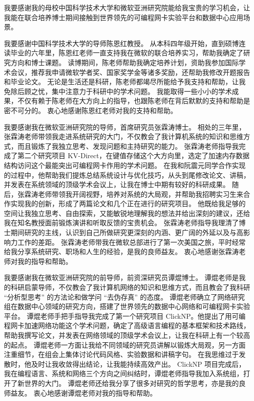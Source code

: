 
\begin{acknowledgements}

我要感谢我的母校中国科学技术⼤学和微软亚洲研究院能给我宝贵的学习机会，让我能在联合培养博士期间接触到世界领先的可编程网卡实验平台和数据中心应用场景。

我要感谢中国科学技术⼤学的导师陈恩红教授。
从本科四年级开始，直到硕博连读毕业的六年里，陈恩红老师一直支持我在微软的联合培养实习，帮助我确定了研究方向和博士课题。
读博期间，陈老师帮助我确定培养计划，资助我参加国际学术会议，推荐我申请微软学者奖、国家奖学金等诸多奖励，还帮助我修改开题报告和毕业论文。
无论是生活还是科研，陈老师都竭尽所能给予我⽀持和帮助，让我免除后顾之忧，集中注意⼒于科研中的学术问题。
我能取得一些小小的学术成果，不仅有赖于陈⽼师在大方向上的指导，也跟陈老师在背后默默的⽀持和帮助是密不可分的。
衷心地感谢陈恩红老师对我的支持和帮助。

我要感谢我在微软亚洲研究院的导师，首席研究员张霖涛博士。
相处的三年里，张霖涛老师带领我走进系统研究的大门，不仅教会了我计算机系统的知识和思维方式，而且锻炼了我独立思考、发现问题和主持研究的能力。
张霖涛老师指导我完成了第二个研究项目 KV-Direct，在键值存储这个大方向里，选定了加速内存数据结构访问这个最能突出可编程网卡作用的学术问题。
在我和阮震元同学合作实现的过程中，他帮助我们提炼总结系统设计与优化技巧，从头到尾修改论文、讲稿，并发表在系统领域的顶级学术会议上，让我在博士中期有较好的科研成果。
随后，张霖涛老师带领我开阔视野，培养对系统的大局观，并帮助我招聘实习生来合作实现我的创新，形成了两篇论文和几个正在进行的研究项目。
他既给我足够的空间让我独立思考、自由探索，又能敏锐地理解我的想法并给出深刻的建议，还给我在知名教授面前锻炼演讲和听取反馈的宝贵机会。
张霖涛老师指导我理清了博士期间研究的主线，认识到自己所做研究更深刻的内涵、更广阔的外延以及与高影响力工作的差距。
张霖涛老师带我在微软总部进行了第一次美国之旅，平时经常给我分享系统研究、职场和人生的经验，是我的良师益友。
衷心地感谢张霖涛老师对我的指导和帮助。

我要感谢我在微软亚洲研究院的前导师，前资深研究员谭焜博⼠。
谭焜老师是我的科研启蒙导师，不仅教会了我计算机⽹络的知识和思维⽅式，⽽且教会了我科研 ``分析型思考'' 的⽅法论和做学问 ``去伪存真'' 的态度。
谭焜老师确立了网络研究组在数据中心领域的研究方向，搭建了世界领先的数据中心网络和可编程网卡实验平台。
谭焜老师手把手指导我完成了第一个研究项目 ClickNP。他提出了用可编程网卡加速网络功能这个学术问题，确定了高级语言编程的基本框架和技术路线，帮助我撰写论文，并发表在网络领域的顶级学术会议上，让我在科研上有一个较高的起点。
谭焜老师一方面让我给不同领域的研究员讲解以锻炼大局观，另一方面注重细节，在组会上集体讨论代码风格、实验数据和讲稿字句。
在我思维过于发散时，他及时让我收敛得出结论，让我能持续高效产出。
ClickNP 项目完成后，我在编程语言、系统和网络三个方向之间纠结时，谭焜老师指导我加入系统组，打开了新世界的大门。
谭焜老师还给我分享了很多对研究的哲学思考，亦是我的良师益友。
衷⼼地感谢谭焜⽼师对我的指导和帮助。


\end{acknowledgements}
